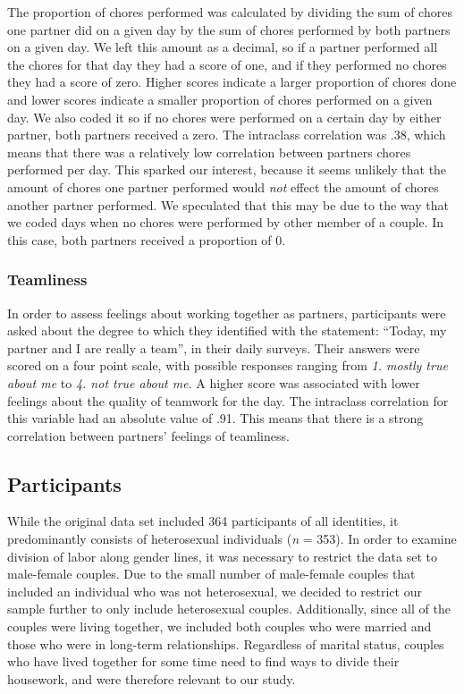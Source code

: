 \documentclass[
  man]{apa6}
\begin{document}
The proportion of chores performed was calculated by dividing the sum of chores one partner did on a given day by the sum of chores performed by both partners on a given day. We left this amount as a decimal, so if a partner performed all the chores for that day they had a score of one, and if they performed no chores they had a score of zero. Higher scores indicate a larger proportion of chores done and lower scores indicate a smaller proportion of chores performed on a given day. We also coded it so if no chores were performed on a certain day by either partner, both partners received a zero. The intraclass correlation was .38, which means that there was a relatively low correlation between partners chores performed per day. This sparked our interest, because it seems unlikely that the amount of chores one partner performed would \emph{not} effect the amount of chores another partner performed. We speculated that this may be due to the way that we coded days when no chores were performed by other member of a couple. In this case, both partners received a proportion of 0.

\hypertarget{teamliness}{%
\subsubsection{Teamliness}\label{teamliness}}

In order to assess feelings about working together as partners, participants were asked about the degree to which they identified with the statement: ``Today, my partner and I are really a team'', in their daily surveys. Their answers were scored on a four point scale, with possible responses ranging from \emph{1. mostly true about me} to \emph{4. not true about me}. A higher score was associated with lower feelings about the quality of teamwork for the day. The intraclass correlation for this variable had an absolute value of .91. This means that there is a strong correlation between partners' feelings of teamliness.

\hypertarget{participants}{%
\subsection{Participants}\label{participants}}

While the original data set included 364 participants of all identities, it predominantly consists of heterosexual individuals (\emph{n} = 353). In order to examine division of labor along gender lines, it was necessary to restrict the data set to male-female couples. Due to the small number of male-female couples that included an individual who was not heterosexual, we decided to restrict our sample further to only include heterosexual couples. Additionally, since all of the couples were living together, we included both couples who were married and those who were in long-term relationships. Regardless of marital status, couples who have lived together for some time need to find ways to divide their housework, and were therefore relevant to our study.
\end{document}
